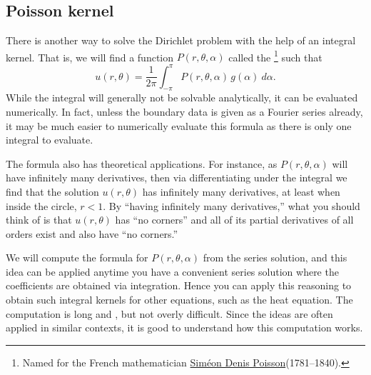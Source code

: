 \documentclass{ximera}
\begin{document}

\subsection{Poisson kernel}

There is another way to solve the Dirichlet problem with the help of an integral kernel.  That is, we will find a function $P(r,\theta,\alpha)$ called the \emph{}%
\footnote{%
    Named for the French mathematician \href{https://en.wikipedia.org/wiki/Sim\%C3\%A9on_Denis_Poisson}{Sim\'eon Denis Poisson}(1781--1840).
    } 
such that
\begin{equation*}
    u(r,\theta) = \frac{1}{2\pi} \int_{-\pi}^{\pi} P(r,\theta,\alpha) \, g(\alpha) ~d\alpha .
\end{equation*}
While the integral will generally not be solvable analytically, it can be evaluated numerically.   In fact, unless the boundary data is given as a Fourier series already, it may be much easier to numerically evaluate this formula as there is only one integral to evaluate.

The formula also has theoretical applications. For instance, as $P(r,\theta,\alpha)$ will have infinitely many derivatives, then via differentiating under the integral we find that the solution $u(r,\theta)$ has infinitely many derivatives, at least when inside the circle, $r < 1$.  By ``having infinitely many derivatives,'' what you should think of is that $u(r,\theta)$ has ``no corners'' and all of its partial derivatives of all orders exist and also have ``no corners.''


We will compute the formula for $P(r,\theta,\alpha)$ from the series solution, and this idea can be applied anytime you have a convenient series solution where the coefficients are obtained via integration. Hence you can apply this reasoning to obtain such integral kernels for other equations, such as the heat equation. The computation is long and , but not overly difficult. Since the ideas are often applied in similar contexts, it is good to understand how this computation works.
\end{document}
